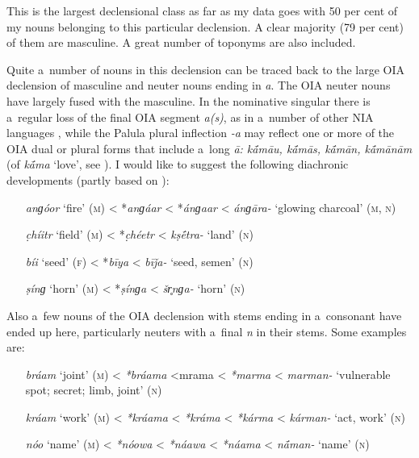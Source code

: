 This is the largest declensional class as far as my data goes with 50 per cent of my nouns belonging to this particular declension. A clear majority (79 per cent) of them are masculine. A great number of toponyms are also included.


Quite a~number of nouns in this declension can be traced back to the large OIA declension of
masculine and neuter nouns ending in \textit{a}. The OIA neuter nouns have largely fused with the
masculine. In the nominative singular there is a~regular loss of the final OIA segment
\textit{a(s)}, as in a~number of other NIA languages \citep[222]{masica1991}, while the Palula
plural inflection \textit{-a} may reflect one or more of the OIA dual or plural forms that include
a~long \textit{ā: k\'{\={a}}māu, k\'{\={a}}mās, k\'{\={a}}mān,
  k\'{\={a}}mānām} (of \textit{k\'{\={a}}ma} `love', see \citealt[330]{whitney1960}). I
would like to suggest the following diachronic developments (partly based on \citealt{turner1966}):

\begin{itemize}[itemsep=0pt, leftmargin=]
\item[\textit{anɡóor} `fire' (\textsc{m})] {\textless} *\textit{anɡáar} {\textless} *\textit{ánɡaar} {\textless} \textit{ánɡāra-} `glowing charcoal' (\textsc{m}, \textsc{n})
\item[\textit{c̣híitr} `field' (\textsc{m})] {\textless} *\textit{c̣héetr} {\textless} \textit{kṣ\'{\={e}}tra-} `land' (\textsc{n})
\item[\textit{bíi} `seed' (\textsc{f})] {\textless} *\textit{bīya} {\textless} \textit{bīǰa-} `seed, semen' (\textsc{n})
\item[\textit{ṣínɡ} `horn' (\textsc{m})] {\textless} *\textit{ṣínɡa} {\textless} \textit{šr̥nɡa-} `horn' (\textsc{n})
\end{itemize}

Also a~few nouns of the OIA declension with stems ending in a~consonant have ended up here, particularly neuters with a~final \textit{n} in their stems. Some examples are: 

\begin{itemize}[itemsep=0pt, leftmargin=]
\item[\textit{bráam} `joint' (\textsc{m})] {\textless} \textit{*bráama} {\textless*mrama} {\textless} \textit{*marma} {\textless} \textit{marman-} `vulnerable spot; secret; limb, joint' (\textsc{n})
\item[\textit{kráam} `work' (\textsc{m})] {\textless} \textit{*kráama} {\textless} \textit{*kráma} {\textless} \textit{*kárma} {\textless} \textit{kárman-} `act, work' (\textsc{n}) 
\item[\textit{nóo} `name' (\textsc{m})] {\textless} \textit{*nóowa} {\textless} \textit{*náawa} {\textless} \textit{*náama} {\textless} \textit{n\'{\={a}}man-} `name' (\textsc{n})
\end{itemize}

